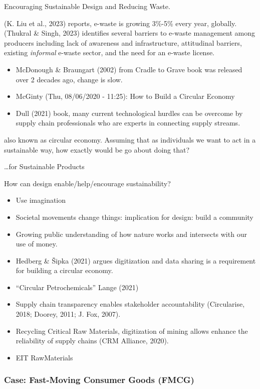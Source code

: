 \documentclass[
  letterpaper,
  DIV=11,
  numbers=noendperiod]{scrartcl}
\begin{document}
Encouraging Sustainable Design and Reducing Waste.

(K. Liu et al., 2023) reports, e-waste is growing 3\%-5\% every year,
globally. (Thukral \& Singh, 2023) identifies several barriers to
e-waste management among producers including lack of awareness and
infrastructure, attitudinal barriers, existing \emph{informal} e-waste
sector, and the need for an e-waste license.

\begin{itemize}
\item
  McDonough \& Braungart (2002) from Cradle to Grave book was released
  over 2 decades ago, change is slow.
\item
  McGinty (Thu, 08/06/2020 - 11:25): How to Build a Circular Economy
\item
  Dull (2021) book, many current technological hurdles can be overcome
  by supply chain professionals who are experts in connecting supply
  streams.
\end{itemize}

also known as circular economy. Assuming that as individuals we want to
act in a sustainable way, how exactly would be go about doing that?

\ldots for Sustainable Products

How can design enable/help/encourage sustainability?

\begin{itemize}
\item
  Use imagination
\item
  Societal movements change things: implication for design: build a
  community
\item
  Growing public understanding of how nature works and intersects with
  our use of money.
\item
  Hedberg \& Šipka (2021) argues digitization and data sharing is a
  requirement for building a circular economy.
\item
  ``Circular Petrochemicals'' Lange (2021)
\item
  Supply chain transparency enables stakeholder accountability
  (Circularise, 2018; Doorey, 2011; J. Fox, 2007).
\item
  Recycling Critical Raw Materials, digitization of mining allows
  enhance the reliability of supply chains (CRM Alliance, 2020).
\item
  EIT RawMaterials
\end{itemize}

\subsubsection{Case: Fast-Moving Consumer Goods
(FMCG)}\label{case-fast-moving-consumer-goods-fmcg}
\end{document}
